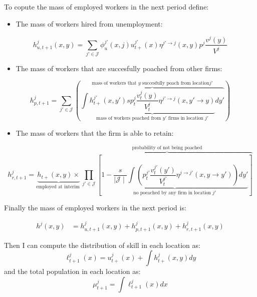 \documentclass[
  letterpaper,
  DIV=11,
  numbers=noendperiod]{scrreprt}
\providecommand{\tightlist}{%
  \setlength{\itemsep}{0pt}\setlength{\parskip}{0pt}}\usepackage{longtable,booktabs,array}
\begin{document}
To copute the mass of employed workers in the next period define:

\begin{itemize}
\tightlist
\item
  The mass of workers hired from unemployment:
\end{itemize}

\begin{equation}
h^j_{u, t+1}(x,y) = \sum_{j'\in \mathcal{J}}\phi_u^{j'}(x,j) u^{j'}_{t+}(x)\eta^{j'\to j}(x,y) p^j\frac{v^j(y)}{V^j}
\end{equation}

\begin{itemize}
\tightlist
\item
  The mass of workers that are succesfully poached from other firms:
\end{itemize}

\begin{equation}
h^j_{p, t+1} = \sum_{j'\in \mathcal{J}}\left(\overbrace{\int\underbrace{ h^{j'}_{t+}(x,y')sp^j_t\frac{v^{j}_t(y)}{V^{j}_t}\eta^{j'\to j}(x,y'\to y)}_{\text{mass of workers poached from } y' \text{ firms in location } j'}dy'}^{\text{mass of workers that } y \text{ succesfully poach from location} j'} \right)
\end{equation}

\begin{itemize}
\tightlist
\item
  The mass of workers that the firm is able to retain:
\end{itemize}

\begin{equation}
h^j_{r,t+1} = \underbrace{h_{t+}(x,y)  \times }_{\text{employed at interim }} \overbrace{\prod_{j'\in\mathcal{J}}\left[ \underbrace{1 - \frac{s}{\mid \mathcal{J} \mid}\int\left( p^{j'}_t\frac{v^{j'}_t(y')}{V^{j'}_t} \eta^{j\to j'}(x,y\to y')\right)dy'}_{\text{no poeached by any firm in location }j'} \right]}^{\text{probability of not being poached}}
\end{equation}

Finally the mass of employed workers in the next period is:

\begin{align}
h^j(x,y) &=  h^j_{u, t+1}(x,y) + h^j_{p, t+1}(x,y) + h^j_{r,t+1}(x,y) 
\end{align}

Then I can compute the distribution of skill in each location as:
\[\ell^j_{t+1}(x) = u^j_{t+}(x) + \int h^j_{t+}(x,y)dy\] and the total
population in each location as: \[\mu^j_{t+1} = \int \ell^j_{t+1}(x)dx\]
\end{document}
